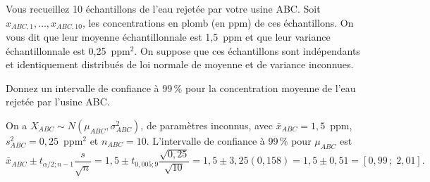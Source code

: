 


\begin{exercice}\label{exo:abc}
Vous recueillez 10 échantillons de l'eau rejetée par votre usine ABC. Soit
$x_{ABC,1},\dots,x_{ABC,10}$, les concentrations en plomb (en ppm) de ces échantillons. On
vous dit que leur moyenne échantillonnale est 1,5~ppm et que leur variance échantillonnale
est 0,25~ppm$^2$. On suppose que ces échantillons sont indépendants et identiquement
distribués de loi normale de moyenne et de variance inconnues.

Donnez un intervalle de confiance à 99\,\% pour la concentration moyenne de l'eau rejetée
par l'usine ABC.
\begin{solution}
On a $X_{ABC}\sim N(\mu_{ABC},\sigma^2_{ABC})$, de paramètres inconnus, avec
$\bar x_{ABC}=1,5$~ppm, $s^2_{ABC}=0,25$~ppm$^2$ et $n_{ABC}=10$.
L'intervalle de confiance à 99\,\% pour $\mu_{ABC}$ est
\[
  \bar x_{ABC}\pm t_{\alpha/2;n-1}\frac{s}{\sqrt n}
  =1,5\pm t_{0,005;9}\frac{\sqrt{0,25}}{\sqrt{10}}
  =1,5\pm 3,25(0,158)=1,5\pm 0,51
  =[0,99\,;\;2,01].
\]
\end{solution}
\end{exercice}

